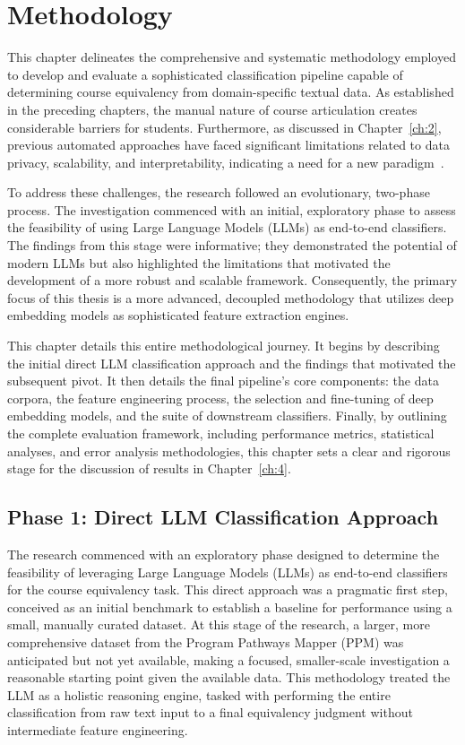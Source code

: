 \chapter{Methodology}\label{ch:3}
This chapter delineates the comprehensive and systematic methodology employed to develop and evaluate a sophisticated classification pipeline capable of determining course equivalency from domain-specific textual data. As established in the preceding chapters, the manual nature of course articulation creates considerable barriers for students. Furthermore, as discussed in Chapter~\ref{ch:2}, previous automated approaches have faced significant limitations related to data privacy, scalability, and interpretability, indicating a need for a new paradigm~\cite{pardos10.1145/3330430.3333622, slade10.1177/0002764213479366}.

To address these challenges, the research followed an evolutionary, two-phase process. The investigation commenced with an initial, exploratory phase to assess the feasibility of using Large Language Models (LLMs) as end-to-end classifiers. The findings from this stage were informative; they demonstrated the potential of modern LLMs but also highlighted the limitations that motivated the development of a more robust and scalable framework. Consequently, the primary focus of this thesis is a more advanced, decoupled methodology that utilizes deep embedding models as sophisticated feature extraction engines.

This chapter details this entire methodological journey. It begins by describing the initial direct LLM classification approach and the findings that motivated the subsequent pivot. It then details the final pipeline's core components: the data corpora, the feature engineering process, the selection and fine-tuning of deep embedding models, and the suite of downstream classifiers. Finally, by outlining the complete evaluation framework, including performance metrics, statistical analyses, and error analysis methodologies, this chapter sets a clear and rigorous stage for the discussion of results in Chapter~\ref{ch:4}.

\section{Phase 1: Direct LLM Classification Approach}\label{ch:3.1}
The research commenced with an exploratory phase designed to determine the feasibility of leveraging Large Language Models (LLMs) as end-to-end classifiers for the course equivalency task. This direct approach was a pragmatic first step, conceived as an initial benchmark to establish a baseline for performance using a small, manually curated dataset. At this stage of the research, a larger, more comprehensive dataset from the Program Pathways Mapper (PPM) was anticipated but not yet available, making a focused, smaller-scale investigation a reasonable starting point given the available data. This methodology treated the LLM as a holistic reasoning engine, tasked with performing the entire classification from raw text input to a final equivalency judgment without intermediate feature engineering.

